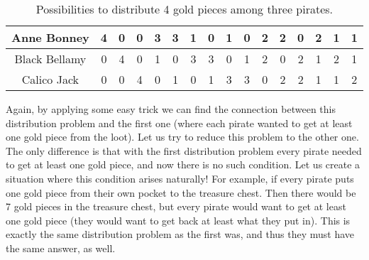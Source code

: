 \begin{table}[!htb]
\caption{Possibilities to distribute 4 gold pieces among three pirates.}\label{tab:4gp3p}
\begin{center}

\begin{tabular}{|c||c|c|c|c|c|c|c|c|c|c|c|c|c|c|c|}
\hline
Anne Bonney & 4 & 0 & 0 & 3 & 3 & 1 & 0 & 1 & 0 & 2 & 2 & 0 & 2 & 1 & 1\\
\hline
Black Bellamy & 0 & 4 & 0 & 1 & 0 & 3 & 3 & 0 & 1 & 2 & 0 & 2 & 1 & 2 & 1\\
\hline
Calico Jack & 0 & 0 & 4 & 0 & 1 & 0 & 1 & 3 & 3 & 0 & 2 & 2 & 1 & 1 & 2\\
\hline
\end{tabular}
\end{center}
\end{table}

Again, by applying some easy trick we can find the connection between this distribution problem and the first one 
(where each pirate wanted to get at least one gold piece from the loot). 
Let us try to reduce this problem to the other one. 
The only difference is that with the first distribution problem every pirate needed to get at least one gold piece, 
and now there is no such condition. 
Let us create a situation where this condition arises naturally!
For example, if every pirate puts one gold piece from their own pocket to the treasure chest. 
Then there would be 7 gold pieces in the treasure chest, 
but every pirate would want to get at least one gold piece 
(they would want to get back at least what they put in). 
This is exactly the same distribution problem as the first was, 
and thus they must have the same answer, as well. 


